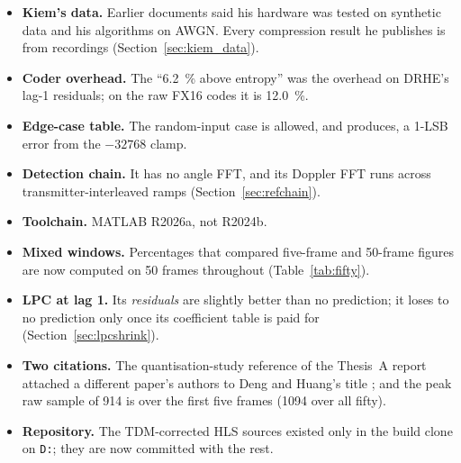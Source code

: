\begin{itemize}
\item \textbf{Kiem's data.} Earlier documents said his hardware was tested on
synthetic data and his algorithms on AWGN. Every compression result he
publishes is from recordings (Section~\ref{sec:kiem_data}).
\item \textbf{Coder overhead.} The ``\SI{6.2}{\percent} above entropy'' was
the overhead on DRHE's lag-1 residuals; on the raw FX16 codes it is
\SI{12.0}{\percent}.
\item \textbf{Edge-case table.} The random-input case is allowed, and produces,
a 1-LSB error from the $-32768$ clamp.
\item \textbf{Detection chain.} It has no angle FFT, and its Doppler FFT runs
across transmitter-interleaved ramps (Section~\ref{sec:refchain}).
\item \textbf{Toolchain.} MATLAB R2026a, not R2024b.
\item \textbf{Mixed windows.} Percentages that compared five-frame and
50-frame figures are now computed on 50 frames throughout
(Table~\ref{tab:fifty}).
\item \textbf{LPC at lag 1.} Its \emph{residuals} are slightly better than no
prediction; it loses to no prediction only once its coefficient table is paid
for (Section~\ref{sec:lpcshrink}).
\item \textbf{Two citations.} The quantisation-study reference of the Thesis~A
report attached a different paper's authors to Deng and Huang's title
\cite{deng2024}; and the peak raw sample of 914 is over the first five frames
(1094 over all fifty).
\item \textbf{Repository.} The TDM-corrected HLS sources existed only in the
build clone on \texttt{D:}; they are now committed with the rest.
\end{itemize}
